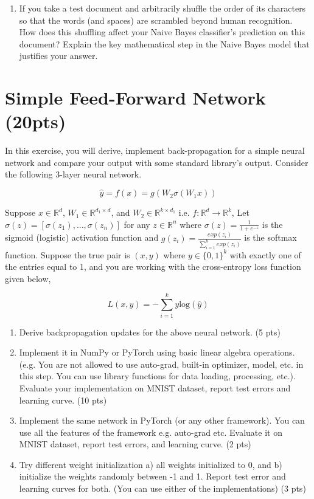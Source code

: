 \documentclass[a4paper]{article}
\theoremstyle{definition}
\begin{document}
\begin{enumerate}
\item If you take a test document and arbitrarily shuffle the order of its characters so that the words (and spaces) are scrambled beyond human recognition.  How does this shuffling affect your Naive Bayes classifier's prediction on this document?  Explain the key mathematical step in the Naive Bayes model that justifies your answer.

\end{enumerate}

\section{Simple Feed-Forward Network (20pts)}
In this exercise, you will derive, implement back-propagation for a simple neural network and compare your output with some standard library’s output. Consider the following 3-layer neural network.

\[
\hat{y} = f(x) = g(W_2\sigma(W_1x))
\]

Suppose $x \in \mathbb{R}^d$, $W_1 \in \mathbb{R}^{d_1 \times d}$, and $W_2 \in \mathbb{R}^{k \times d_1}$ i.e. $f: \mathbb{R}^d \rightarrow \mathbb{R}^k$, Let $\sigma(z) = [\sigma(z_1), ..., \sigma(z_n)]$ for any $z \in \mathbb{R}^n$ where $\sigma(z) = \frac{1}{1 + e^{-z}}$ is the sigmoid (logistic) activation function and $g(z_i) = \frac{exp(z_i)}{\sum_{i=1}^k exp(z_i)}$ is the softmax function. Suppose the true pair is $(x, y)$ where $y \in \{0, 1\}^k$ with exactly one of the entries equal to 1, and you are working with the cross-entropy loss function given below,

\[
L(x, y) = -\sum_{i=1}^k y \text{log}(\hat{y})
\]

\begin{enumerate}
    \item Derive backpropagation updates for the above neural network. (5 pts)
    \item Implement it in NumPy or PyTorch using basic linear algebra operations. (e.g. You are not allowed to use auto-grad, built-in optimizer, model, etc. in this step. You can use library functions for data loading, processing, etc.). Evaluate your implementation on MNIST dataset, report test errors and learning curve. (10 pts)
    \item Implement the same network in PyTorch (or any other framework). You can use all the features of the framework e.g. auto-grad etc. Evaluate it on MNIST dataset, report test errors, and learning curve. (2 pts)
    \item Try different weight initialization a) all weights initialized to 0, and b) initialize the weights randomly between -1 and 1. Report test error and learning curves for both. (You can use either of the implementations) (3 pts)
\end{enumerate}
\end{document}
